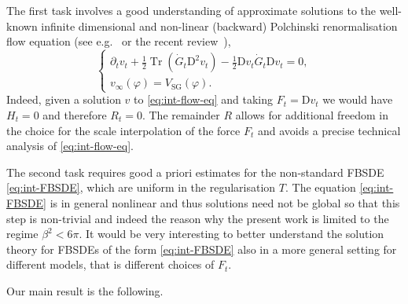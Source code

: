 \documentclass[11pt, a4paper]{scrartcl}
\numberwithin{equation}{section}
\theoremstyle{plain}
\theoremstyle{remark}
\newcommand{\mathD}{\mathrm{D}}
\newcommand{\tmop}[1]{\ensuremath{\operatorname{#1}}}
\begin{document}
The first task involves a good understanding of approximate solutions to the
well-known infinite dimensional and non-linear (backward) Polchinski renormalisation flow
equation (see
e.g.~{\cite{salmhoferRenormalization1999}} or the recent
review~{\cite{bauerschmidtStochasticDynamicsPolchinski}}),
\begin{equation}
  \begin{cases}
    \partial_t v_t + \frac{1}{2} \tmop{Tr} (\dot{G}_t \mathD^2 v_t) -
    \frac{1}{2} \mathD v_t  \dot{G}_t \mathD v_t = 0,\\
    v_{\infty} (\varphi) = V_{\tmop{SG}} (\varphi).
  \end{cases} \label{eq:int-flow-eq}
\end{equation}
Indeed, given a solution $v$ to \eqref{eq:int-flow-eq} and taking $F_t =
\mathD v_t$ we would have $H_t = 0$ and therefore $R_t = 0$. The remainder $R$
allows for additional freedom in the choice for the scale interpolation of the
force $F_t$ and avoids a precise technical analysis of \eqref{eq:int-flow-eq}.

The second task requires good a priori estimates for the non-standard FBSDE
\eqref{eq:int-FBSDE}, which are uniform in the regularisation $T$. The
equation \eqref{eq:int-FBSDE} is in general nonlinear and thus solutions need
not be global so that this step is non-trivial and indeed the reason why the present
work is limited to the regime $\beta^2 < 6 \pi$. It would be very interesting
to better understand the solution theory for FBSDEs of the form
\eqref{eq:int-FBSDE} also in a more general setting for different models, that
is different choices of $F_t$.

Our main result is the following.
\end{document}
